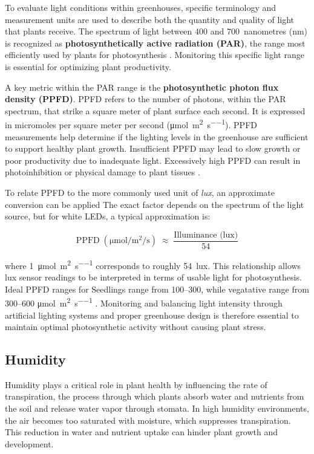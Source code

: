 To evaluate light conditions within greenhouses, specific terminology and measurement units are used to describe both the quantity and quality of light that plants receive. The spectrum of light between 400 and 700~nanometres (nm) is recognized as \textbf{photosynthetically active radiation (PAR)}, the range most efficiently used by plants for photosynthesis \citep{sena2024}. Monitoring this specific light range is essential for optimizing plant productivity.

A key metric within the PAR range is the \textbf{photosynthetic photon flux density (PPFD)}. PPFD refers to the number of photons, within the PAR spectrum, that strike a square meter of plant surface each second. It is expressed in micromoles per square meter per second (\si{\micro\mole\per\metre\squared\per\second}). PPFD measurements help determine if the lighting levels in the greenhouse are sufficient to support healthy plant growth. Insufficient PPFD may lead to slow growth or poor productivity due to inadequate light. Excessively high PPFD can result in photoinhibition or physical damage to plant tissues \citep{measuring_ppfd}.

To relate PPFD to the more commonly used unit of \textit{lux}, an approximate conversion can be applied 
The exact factor depends on the spectrum of the light source, but for white LEDs, a typical approximation is:  

\begin{equation}
	\text{PPFD} \; (\si{\micro\mole\per\metre\squared\per\second}) 
	\;\approx\; \frac{\text{Illuminance (lux)}}{54} \label{ppfd}
\end{equation}

where 1~\si{\micro\mole\per\metre\squared\per\second} corresponds to roughly 54~lux. 
This relationship allows lux sensor readings to be interpreted in terms of usable light for photosynthesis.  \citep{ahn2017} Ideal PPFD ranges for Seedlings range from 100–300, while vegatative range from 300–600 \si{\micro\mole\per\metre\squared\per\second} \citep{definitiveGrowLight2024}. Monitoring and balancing light intensity through artificial lighting systems and proper greenhouse design is therefore essential to maintain optimal photosynthetic activity without causing plant stress.


\subsection{Humidity} 

Humidity plays a critical role in plant health by influencing the rate of transpiration, the process through which plants absorb water and nutrients from the soil and release water vapor through stomata. In high humidity environments, the air becomes too saturated with moisture, which suppresses transpiration. This reduction in water and nutrient uptake can hinder plant growth and development.

